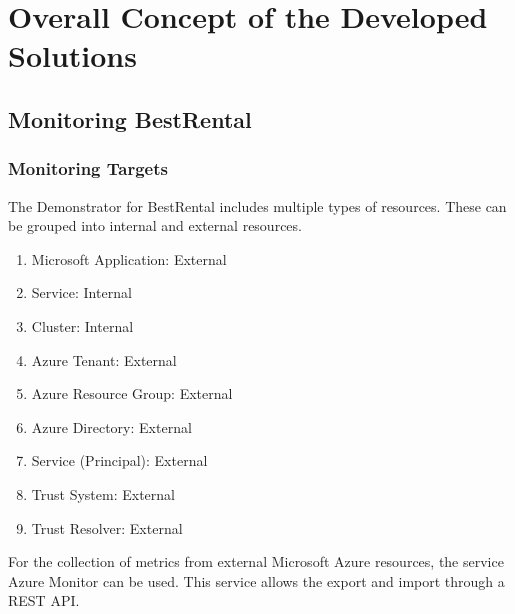 \chapter{Overall Concept of the Developed Solutions}



\section{Monitoring BestRental}

\subsection{Monitoring Targets}

The Demonstrator for BestRental includes multiple types of resources.
These can be grouped into internal and external resources.
\begin{enumerate}
    \item Microsoft Application: External
    \item Service: Internal
    \item Cluster: Internal
    \item Azure Tenant: External
    \item Azure Resource Group: External
    \item Azure Directory: External
    \item Service (Principal): External
    \item Trust System: External
    \item Trust Resolver: External
\end{enumerate}

For the collection of metrics from external Microsoft Azure resources, the service Azure Monitor can be used.
This service allows the export and import through a REST API.